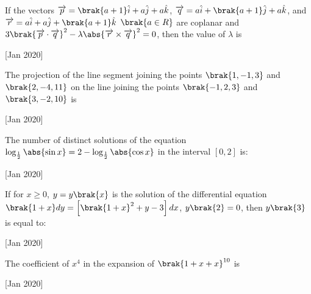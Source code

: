     \item If the vectors $\overrightarrow{p} = \brak{a+1}\hat{i}+a\hat{j}+a\hat{k}$, $\overrightarrow{q} = a\hat{i}+\brak{a+1}\hat{j}+a\hat{k}$, and $\overrightarrow{r} = a\hat{i}+a\hat{j}+\brak{a+1}\hat{k}$ $\brak{a\in R}$ are coplanar and $3\brak{\overrightarrow{p}\cdot\overrightarrow{q}}^2 - \lambda\abs{\overrightarrow{r}\times \overrightarrow{q}}^2=0$, then the value of $\lambda$ is
    
    \hfill{[Jan 2020]}

    \item The projection of the line segment joining the points $\brak{1,-1,3}$ and $\brak{2,-4,11}$ on the line joining the points $\brak{-1,2,3}$ and $\brak{3,-2,10}$ is
    
    \hfill{[Jan 2020]}
		
    \item The number of distinct solutions of the equation $\log_{\frac{1}{2}}\abs{\sin x} = 2-\log_{\frac{1}{2}}\abs{\cos x}$ in the interval $\left[0, 2\right]$ is:
    
    \hfill{[Jan 2020]}

    \item If for $x\geq 0$, $y=y\brak{x}$ is the solution of the differential equation $\brak{1+x}dy=\left[ \brak{1+x}^2 +y-3\right]dx$, $y\brak{2}=0$, then $y\brak{3}$ is equal to:
    
    \hfill{[Jan 2020]}
	
    \item The coefficient of $x^4$ in the expansion of $\brak{1+x+x}^{10}$ is
    
    \hfill{[Jan 2020]}
